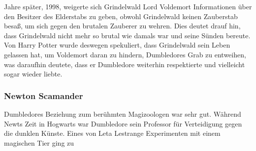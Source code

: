 \documentclass[a4paper, 10pt]{article}
\begin{document}
\vspace{10pt}
\newline
Jahre später, 1998, weigerte sich Grindelwald Lord Voldemort Informationen über den Besitzer des Elderstabs zu geben, obwohl Grindelwald keinen Zauberstab besaß, um sich gegen den brutalen Zauberer zu wehren. Dies deutet drauf hin, dass Grindelwald nicht mehr so brutal wie damals war und seine Sünden bereute. Von Harry Potter wurde deswegen spekuliert, dass Grindelwald sein Leben gelassen hat, um Voldemort daran zu hindern, Dumbledores Grab zu entweihen, was daraufhin deutete, dass er Dumbledore weiterhin respektierte und vielleicht sogar wieder liebte.
\subsubsection*{\large Newton Scamander}
Dumbledores Beziehung zum berühmten Magizoologen war sehr gut. Während Newts Zeit in Hogwarts war Dumbledore sein Professor für Verteidigung gegen die dunklen Künste. Eines von Leta Lestrange Experimenten mit einem magischen Tier ging zu
\end{document}
